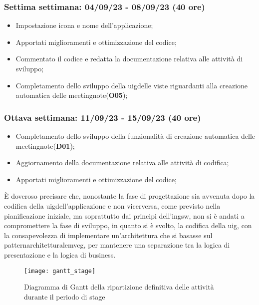 \subsubsection{Settima settimana: 04/09/23 - 08/09/23 (40 ore)}
    \begin{itemize}
        \item Impostazione icona e nome dell'applicazione;
        \item Apportati miglioramenti e ottimizzazione del codice;
        \item Commentato il codice e redatta la documentazione relativa alle attività di sviluppo;
        \item Completamento dello sviluppo della \gls{uig}\glsoccur delle viste riguardanti alla creazione automatica delle \gls{meetingnote}\glsoccur  (\textbf{O05});
    \end{itemize}
\subsubsection{Ottava settimana: 11/09/23 - 15/09/23 (40 ore)}
    \begin{itemize}
        \item Completamento dello sviluppo della funzionalità di creazione automatica delle \gls{meetingnote}\glsoccur (\textbf{D01});
        \item Aggiornamento della documentazione relativa alle attività di codifica;
        \item Apportati miglioramenti e ottimizzazione del codice;
    \end{itemize}

È doveroso precisare che, nonostante la fase di progettazione sia avvenuta dopo la codifica della \gls{uig}\glsoccur dell'applicazione e non vicerversa, come previsto nella pianificazione iniziale, ma soprattutto dai principi dell'\gls{ingsw}\glsoccur, non si è andati a compromettere la fase di sviluppo, in quanto si è svolto, la codifica della \gls{uig}\glsoccur, con la consapevolezza di implementare un'architettura che si basasse sul \gls{patternarchitetturale}\glsoccur \Gls{mvcg}\glsoccur, per mantenere una separazione tra la logica di presentazione e la logica di business.

\begin{figure}[!h] 
    \centering 
    \texttt{[image: gantt\_stage]} 
    \caption{Diagramma di Gantt della ripartizione definitiva delle attività durante il periodo di stage}
    \label{fig:gantt}
\end{figure}

